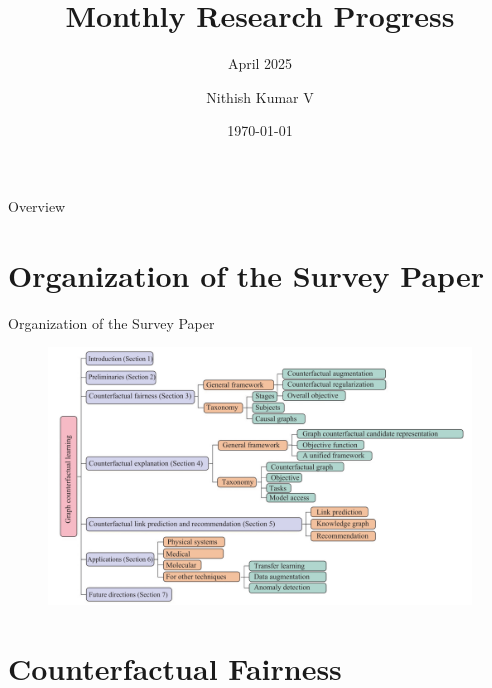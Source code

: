\documentclass[aspectratio=169,xcolor=dvipsnames]{beamer}
\title{Monthly Research Progress}
\subtitle{April 2025}
\author{Nithish Kumar V}
\institute
{
	Department of Computer Science and Engineering \\
	Indian Institute of Information Technology, Design and Manufacturing, Kancheepuram
}
\date{\today}
\begin{document}
	
	\begin{frame}
		\titlepage
	\end{frame}
	
	\begin{frame}{Overview}
		\tableofcontents
	\end{frame}
	\section{Organization of the Survey Paper}
	\begin{frame}{Organization of the Survey Paper}
		\begin{figure}
		\includegraphics[width=0.8\linewidth]{paper_structure.png}
		\end{figure}
	\end{frame}
	\section{Counterfactual Fairness}
	
\end{document}
